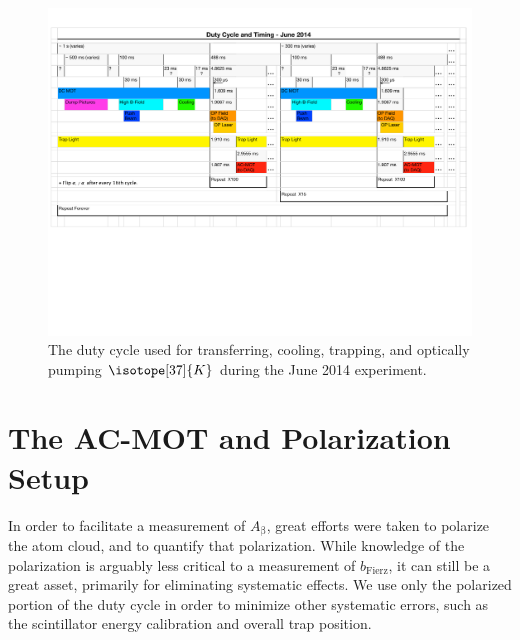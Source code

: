 \begin{figure}[h!!t]
	\centering
	\includegraphics[width=.999\linewidth]
	{Figures/DutyCycle_2014.pdf}
	\caption{The duty cycle used for transferring, cooling, trapping, and optically pumping $\isotope[37]{K}$ during the June 2014 experiment.}	
	\label{fig:dutycycle}
\end{figure}

\section{The AC-MOT and Polarization Setup}
\label{section:acmot_and_polarization}
In order to facilitate a measurement of $A_{\mathrm{\beta}}$, great efforts were taken to polarize the atom cloud, and to quantify that polarization.  
While knowledge of the polarization is arguably less critical to a measurement of $b_{\mathrm{Fierz}}$, it can still be a great asset, primarily for eliminating systematic effects.  We use only the polarized portion of the duty cycle in order to minimize other systematic errors, such as the scintillator energy calibration and overall trap position.  


